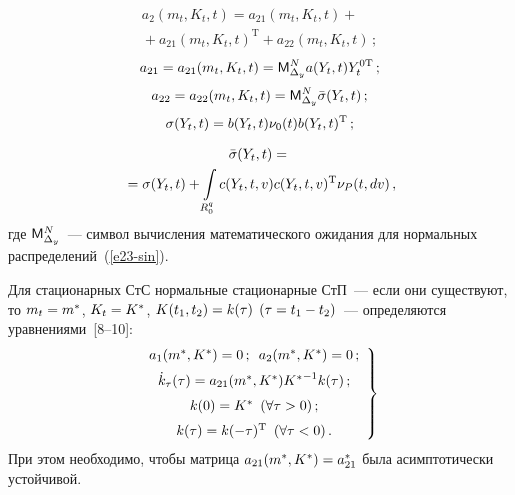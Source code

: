 \begin{multicols}{2}
    \vspace*{-12pt}
    
    \noindent
    \begin{multline*}
     a_2 (m_t, K_t, t) = a_{21} (m_t, K_t, t)+{}\\
     {}+ a_{21} (m_t, K_t, t)^{\mathrm{T}} +
    a_{22}(m_t, K_t, t)\,;
    \end{multline*}
    $$
    a_{21} = a_{21}(m_t, K_t, t)=  {\sf M}_{\Delta_y}^N a(Y_t, t) Y_{t}^{\mathrm{0T}}\,;
    $$
    $$
    a_{22} = a_{22}(m_t, K_t, t)= {\sf M}_{\Delta_y}^N \bar{\sigma} (Y_t, t)\,;
    $$
    $$
    \sigma (Y_t, t)=b(Y_t, t) \nu_0(t) b(Y_t, t)^{\mathrm{T}}\,;
    $$

    \vspace*{-12pt}
    
    \noindent
    \begin{multline}
    \bar{\sigma} (Y_t, t) ={}\\
    {}= \sigma (Y_t, t)+\int\limits_{R_0^q} c (Y_t, t, v) 
    c(Y_t, t,v)^{\mathrm{T}} \nu_P (t, dv)\,,\label{e25-sin}
    \end{multline}
где ${\sf M}_{\Delta_y}^N$~--- символ вычисления математического ожидания для 
нормальных распределений~(\ref{e23-sin}).

Для стационарных СтС нормальные стационарные СтП~--- если они
существуют, то  $m_t \hm= m^*$, $ K_t \hm= K^*$, $K(t_1, t_2) \hm=
k(\tau)$ $(\tau \hm= t_1-t_2)$~--- определяются уравнениями~[8--10]:
    \begin{equation}
    \left.
    \begin{array}{c}
    a_1 (m^*, K^*) =0\,;\enskip a_2 (m^*, K^*)=0\,;\\[6pt]
    \dot k_\tau (\tau) = a_{21} (m^*, K^*) {K^*}^{-1} k(\tau)\,;\\[6pt] 
    k(0) =K^* \enskip (\forall \tau >0)\,; \\[6pt] 
    k(\tau) = k(-\tau)^{\mathrm{T}} \enskip (\forall\tau <0)\,.
    \end{array}
    \right\}
    \label{e26-sin}
    \end{equation}
При этом необходимо, чтобы матрица  $a_{21} ( m^*, K^*)\hm= a^*_{21}$ 
была асимптотически устойчивой.


\end{multicols}

